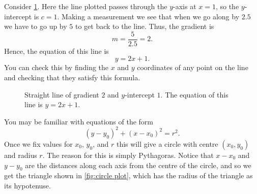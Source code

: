 \documentclass[fleqn]{LectureClass/LectureClass}
\begin{document}
    \begin{exm}{}{}
        Consider \cref{fig:straight line plot}.
        Here the line plotted passes through the \(y\)-axis at \(x = 1\), so the \(y\)-intercept is \(c = 1\).
        Making a measurement we see that when we go along by \(2.5\) we have to go up by \(5\) to get back to the line.
        Thus, the gradient is
        \begin{equation}
            m = \frac{5}{2.5} = 2.
        \end{equation}
        Hence, the equation of this line is
        \begin{equation}
            y = 2x + 1.
        \end{equation}
        You can check this by finding the \(x\) and \(y\) coordinates of any point on the line and checking that they satisfy this formula.
    \end{exm}
    
    \begin{figure}
        \centering
        \caption[Straight line.]{Straight line of gradient \(2\) and \(y\)-intercept \(1\). The equation of this line is \(y = 2x + 1\).}
        \label{fig:straight line plot}
    \end{figure}
    
    You may be familiar with equations of the form
    \begin{equation}
        (y - y_0)^2 + (x - x_0)^2 = r^2.
    \end{equation}
    Once we fix values for \(x_0\), \(y_0\), and \(r\) this will give a circle with centre \((x_0, y_0)\) and radius \(r\).
    The reason for this is simply Pythagoras.
    Notice that \(x - x_0\) and \(y - y_0\) are the distances along each axis from the centre of the circle, and so we get the triangle shown in \cref{fig:circle plot}, which has the radius of the triangle as its hypotenuse.
    
\end{document}
